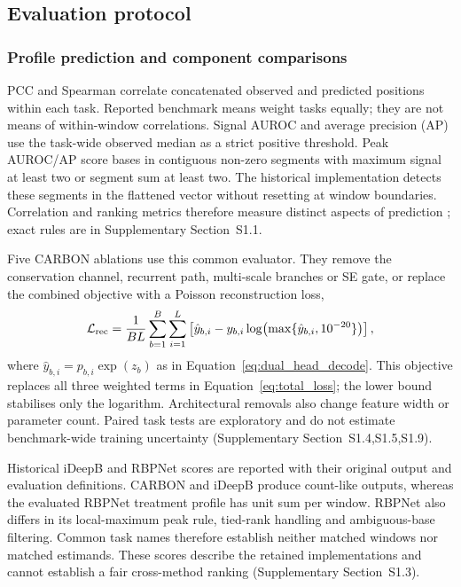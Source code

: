 \documentclass[webpdf,contemporary,large]{oup-authoring-template}
\newcommand{\supsect}[1]{Supplementary Section~#1}
\begin{document}
\subsection{Evaluation protocol}\label{subsec:metrics}

\subsubsection{Profile prediction and component comparisons}

PCC and Spearman correlate concatenated observed and predicted positions within each task. Reported benchmark means weight tasks equally; they are not means of within-window correlations. Signal AUROC and average precision (AP) use the task-wide observed median as a strict positive threshold. Peak AUROC/AP score bases in contiguous non-zero segments with maximum signal at least two or segment sum at least two. The historical implementation detects these segments in the flattened vector without resetting at window boundaries. Correlation and ranking metrics therefore measure distinct aspects of prediction \citep{davis2006prroc,saito2015precision}; exact rules are in \supsect{S1.1}.

Five CARBON ablations use this common evaluator. They remove the conservation channel, recurrent path, multi-scale branches or SE gate, or replace the combined objective with a Poisson reconstruction loss,
\begin{equation}
\mathcal L_{\rm rec}=\frac1{BL}\sum_{b=1}^{B}\sum_{i=1}^{L}
\left[\hat y_{b,i}-y_{b,i}\log\!\left(\max\{\hat y_{b,i},10^{-20}\}\right)\right],
\label{eq:reconstruction_loss}
\end{equation}
where $\hat y_{b,i}=p_{b,i}\exp(z_b)$ as in Equation~\ref{eq:dual_head_decode}. This objective replaces all three weighted terms in Equation~\ref{eq:total_loss}; the lower bound stabilises only the logarithm. Architectural removals also change feature width or parameter count. Paired task tests are exploratory and do not estimate benchmark-wide training uncertainty (\supsect{S1.4,S1.5,S1.9}).

Historical iDeepB and RBPNet scores are reported with their original output and evaluation definitions. CARBON and iDeepB produce count-like outputs, whereas the evaluated RBPNet treatment profile has unit sum per window. RBPNet also differs in its local-maximum peak rule, tied-rank handling and ambiguous-base filtering. Common task names therefore establish neither matched windows nor matched estimands. These scores describe the retained implementations and cannot establish a fair cross-method ranking (\supsect{S1.3}).
\end{document}
